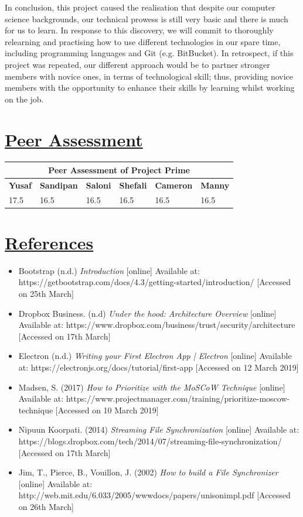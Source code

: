 \documentclass{article}
\begin{document}
\noindent In conclusion, this project caused the realisation that despite our computer science backgrounds, our technical prowess is still very basic and there is much for us to learn. In response to this discovery, we will commit to thoroughly relearning and practising how to use different technologies in our spare time, including programming languages and Git (e.g. BitBucket). In retrospect, if this project was repeated, our different approach would be to partner stronger members with novice ones, in terms of technological skill; thus, providing novice members with the opportunity to enhance their skills by learning whilst working on the job.   

\section{\underline{Peer Assessment}}
\begin{tabular}{|p{2cm}|p{2cm}|p{2cm}|p{2cm}|p{2cm}|p{2cm}|}
\hline
\multicolumn{6}{|c|}{\textbf{Peer Assessment of Project Prime}} \\
\hline
\textbf{Yusaf} & \textbf{Sandipan} & \textbf{Saloni} & \textbf{Shefali} & \textbf{Cameron} & \textbf{Manny} \\
\hline
17.5 & 16.5 & 16.5 & 16.5 & 16.5 & 16.5 \\
\hline
\end{tabular}
	
\section{\underline{References}}
\begin{itemize}
\item Bootstrap (n.d.) \textit{Introduction} [online] Available at: https://getbootstrap.com/docs/4.3/getting-started/introduction/ [Accessed on 25th March]
\item Dropbox Business. (n.d) \textit{Under the hood: Architecture Overview} [online] Available at: https://www.dropbox.com/business/trust/security/architecture [Accessed on 17th March]
\item Electron (n.d.) \textit{Writing your First Electron App | Electron} [online] Available at: https://electronjs.org/docs/tutorial/first-app [Accessed on 12 March 2019]
\item Madsen, S. (2017) \textit{How to Prioritize with the MoSCoW Technique} [online] Available at: https://www.projectmanager.com/training/prioritize-moscow-technique [Accessed on 10 March 2019]
\item Nipuun Koorpati. (2014) \textit{Streaming File Synchronization } [online] Available at: https://blogs.dropbox.com/tech/2014/07/streaming-file-synchronization/ [Accessed on 17th March]
\item Jim, T., Pierce, B., Vouillon, J.  (2002) \textit{How to build a File Synchronizer} [online] Available at: http://web.mit.edu/6.033/2005/wwwdocs/papers/unisonimpl.pdf [Accessed on 26th March]
\end{itemize}
\end{document}
